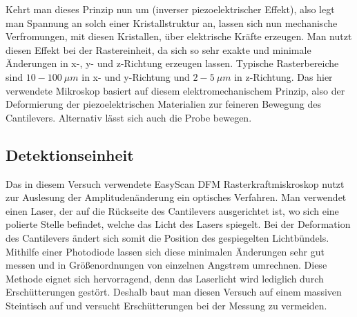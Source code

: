 Kehrt man dieses Prinzip nun um (inverser piezoelektrischer Effekt), also legt man Spannung an solch einer Kristallstruktur an, lassen sich nun mechanische Verfromungen, mit diesen Kristallen, über elektrische Kräfte erzeugen.
Man nutzt diesen Effekt bei der Rastereinheit, da sich so sehr exakte und minimale Änderungen in x-, y- und z-Richtung erzeugen lassen.
Typische Rasterbereiche sind $10-\SI{100}{\mu m}$ in x- und y-Richtung und $2-\SI{5}{\mu m}$ in z-Richtung.
Das hier verwendete Mikroskop basiert auf diesem elektromechanischem Prinzip, also der Deformierung der piezoelektrischen Materialien zur feineren Bewegung des Cantilevers.
Alternativ lässt sich auch die Probe bewegen.




 \subsection{Detektionseinheit}
 
 Das in diesem Versuch verwendete EasyScan DFM Rasterkraftmiskroskop nutzt zur Auslesung der Amplitudenänderung ein optisches Verfahren. 
 Man verwendet einen Laser, der auf die Rückseite des Cantilevers ausgerichtet ist, wo sich eine polierte Stelle befindet, welche das Licht des Lasers spiegelt.
 Bei der Deformation des Cantilevers ändert sich somit die Position des gespiegelten Lichtbündels.
 Mithilfe einer Photodiode lassen sich diese minimalen Änderungen sehr gut messen und in Größenordnungen von einzelnen Angstrøm umrechnen.
 Diese Methode eignet sich hervorragend, denn das Laserlicht wird lediglich durch Erschütterungen gestört.
 Deshalb baut man diesen Versuch auf einem massiven Steintisch auf und versucht Erschütterungen bei der Messung zu vermeiden.

